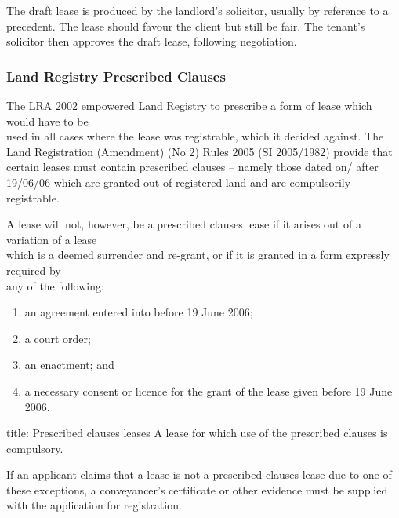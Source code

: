 \documentclass[
]{article}
\newenvironment{Shaded}{}{}
\newcommand{\NormalTok}[1]{#1}
\providecommand{\tightlist}{%
  \setlength{\itemsep}{0pt}\setlength{\parskip}{0pt}}
\begin{document}
The draft lease is produced by the landlord's solicitor, usually by
reference to a precedent. The lease should favour the client but still
be fair. The tenant's solicitor then approves the draft lease, following
negotiation.

\hypertarget{land-registry-prescribed-clauses}{%
\subsubsection{Land Registry Prescribed
Clauses}\label{land-registry-prescribed-clauses}}

The LRA 2002 empowered Land Registry to prescribe a form of lease which
would have to be\\
used in all cases where the lease was registrable, which it decided
against. The Land Registration (Amendment) (No 2) Rules 2005 (SI
2005/1982) provide that certain leases must contain prescribed clauses
-- namely those dated on/ after 19/06/06 which are granted out of
registered land and are compulsorily registrable.

A lease will not, however, be a prescribed clauses lease if it arises
out of a variation of a lease\\
which is a deemed surrender and re-grant, or if it is granted in a form
expressly required by\\
any of the following:

\begin{enumerate}
\def\labelenumi{\arabic{enumi}.}
\tightlist
\item
  an agreement entered into before 19 June 2006;
\item
  a court order;
\item
  an enactment; and
\item
  a necessary consent or licence for the grant of the lease given before
  19 June 2006.
\end{enumerate}

\begin{Shaded}
\begin{Highlighting}[]
\NormalTok{title: Prescribed clauses leases}
\NormalTok{A lease for which use of the prescribed clauses is compulsory. }
\end{Highlighting}
\end{Shaded}

\begin{Shaded}
\begin{Highlighting}[]
\NormalTok{If an applicant claims that a lease is not a prescribed clauses lease due to one of these exceptions, a conveyancer’s certificate or other evidence must be supplied with the application for registration.}
\end{Highlighting}
\end{Shaded}
\end{document}
